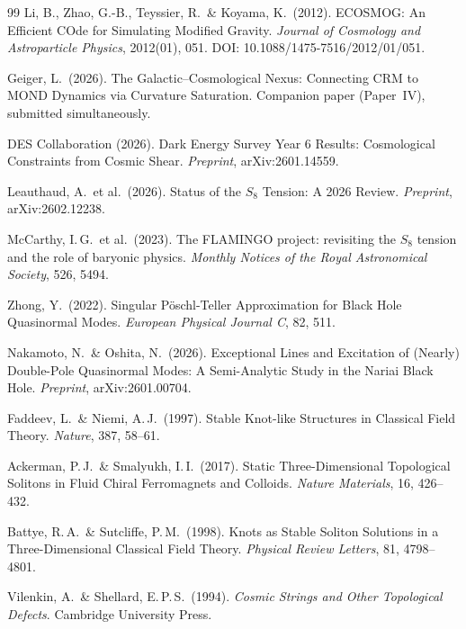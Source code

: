 \documentclass[11pt,a4paper]{article}
\begin{document}
\begin{thebibliography}{99}
Li, B., Zhao, G.-B., Teyssier, R.\ \& Koyama, K.\ (2012).
ECOSMOG: An Efficient COde for Simulating Modified Gravity.
\textit{Journal of Cosmology and Astroparticle Physics}, 2012(01), 051.
DOI: 10.1088/1475-7516/2012/01/051.

Geiger, L.\ (2026).
The Galactic--Cosmological Nexus: Connecting CRM to MOND Dynamics via Curvature Saturation.
Companion paper (Paper~IV), submitted simultaneously.

DES Collaboration (2026).
Dark Energy Survey Year 6 Results: Cosmological Constraints from Cosmic Shear.
\textit{Preprint}, arXiv:2601.14559.

Leauthaud, A.\ et al.\ (2026).
Status of the $S_8$ Tension: A 2026 Review.
\textit{Preprint}, arXiv:2602.12238.

McCarthy, I.\,G.\ et al.\ (2023).
The FLAMINGO project: revisiting the $S_8$ tension and the role of baryonic physics.
\textit{Monthly Notices of the Royal Astronomical Society}, 526, 5494.

Zhong, Y.\ (2022).
Singular P\"oschl-Teller Approximation for Black Hole Quasinormal Modes.
\textit{European Physical Journal C}, 82, 511.

Nakamoto, N.\ \& Oshita, N.\ (2026).
Exceptional Lines and Excitation of (Nearly) Double-Pole Quasinormal Modes: A Semi-Analytic Study in the Nariai Black Hole.
\textit{Preprint}, arXiv:2601.00704.

Faddeev, L.\ \& Niemi, A.\,J.\ (1997).
Stable Knot-like Structures in Classical Field Theory.
\textit{Nature}, 387, 58--61.

Ackerman, P.\,J.\ \& Smalyukh, I.\,I.\ (2017).
Static Three-Dimensional Topological Solitons in Fluid Chiral Ferromagnets and Colloids.
\textit{Nature Materials}, 16, 426--432.

Battye, R.\,A.\ \& Sutcliffe, P.\,M.\ (1998).
Knots as Stable Soliton Solutions in a Three-Dimensional Classical Field Theory.
\textit{Physical Review Letters}, 81, 4798--4801.

Vilenkin, A.\ \& Shellard, E.\,P.\,S.\ (1994).
\textit{Cosmic Strings and Other Topological Defects}. Cambridge University Press.

\end{thebibliography}
\end{document}
